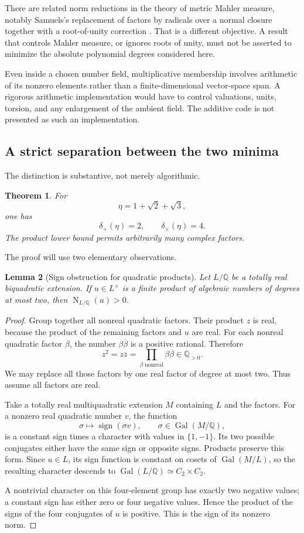 \documentclass[11pt,letterpaper]{article}
\newtheorem{theorem}{Theorem}[section]
\newtheorem{lemma}[theorem]{Lemma}
\theoremstyle{definition}
\newcommand{\Q}{\mathbb Q}
\newcommand{\Gal}{\operatorname{Gal}}
\newcommand{\Nm}{\operatorname{N}}
\newcommand{\dplus}{\delta_{+}}
\newcommand{\dtimes}{\delta_{\times}}
\begin{document}
There are related norm reductions in the theory of metric Mahler measure, notably Samuels's replacement of factors by radicals over a normal closure together with a root-of-unity correction \cite{samuels}. That is a different objective. A result that controls Mahler measure, or ignores roots of unity, must not be asserted to minimize the absolute polynomial degrees considered here.

Even inside a chosen number field, multiplicative membership involves arithmetic of its nonzero elements rather than a finite-dimensional vector-space span. A rigorous arithmetic implementation would have to control valuations, units, torsion, and any enlargement of the ambient field. The additive code is not presented as such an implementation.

\subsection{A strict separation between the two minima}
The distinction is substantive, not merely algorithmic.
\begin{samepage}
\begin{theorem}\label{thm:separation}
For
\[
 \eta=1+\sqrt2+\sqrt3,
\]
one has
\[
 \boxed{\dplus(\eta)=2,\qquad \dtimes(\eta)=4.}
\]
The product lower bound permits arbitrarily many complex factors.
\end{theorem}
\end{samepage}
The proof will use two elementary observations.

\begin{lemma}[Sign obstruction for quadratic products]\label{lem:sign}
Let $L/\Q$ be a totally real biquadratic extension. If $u\in L^{\times}$ is a finite product of algebraic numbers of degrees at most two, then $\Nm_{L/\Q}(u)>0$.
\end{lemma}
\begin{proof}
Group together all nonreal quadratic factors. Their product $z$ is real, because the product of the remaining factors and $u$ are real. For each nonreal quadratic factor $\beta$, the number $\beta\overline\beta$ is a positive rational. Therefore
\[
 z^2=z\overline z=\prod_{\beta\text{ nonreal}}\beta\overline\beta\in\Q_{>0}.
\]
We may replace all those factors by one real factor of degree at most two. Thus assume all factors are real.

Take a totally real multiquadratic extension $M$ containing $L$ and the factors. For a nonzero real quadratic number $v$, the function
\[
 \sigma\longmapsto\operatorname{sign}(\sigma v),\qquad
 \sigma\in\Gal(M/\Q),
\]
is a constant sign times a character with values in $\{1,-1\}$. Its two possible conjugates either have the same sign or opposite signs. Products preserve this form. Since $u\in L$, its sign function is constant on cosets of $\Gal(M/L)$, so the resulting character descends to $\Gal(L/\Q)\simeq C_2\times C_2$.

A nontrivial character on this four-element group has exactly two negative values; a constant sign has either zero or four negative values. Hence the product of the signs of the four conjugates of $u$ is positive. This is the sign of its nonzero norm.
\end{proof}
\end{document}
